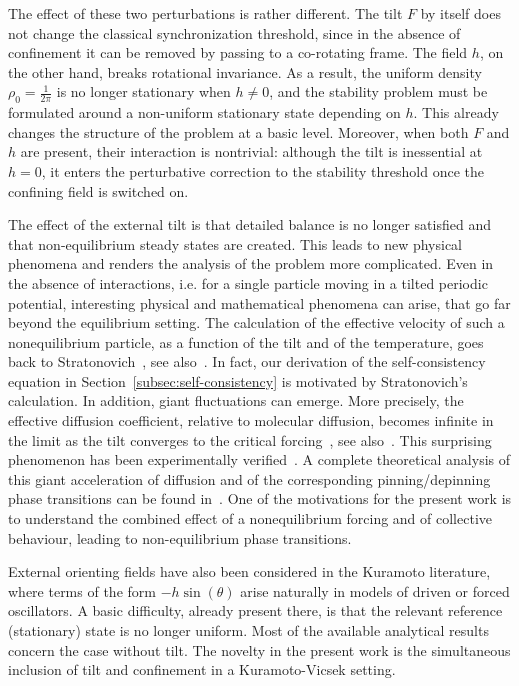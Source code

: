 \documentclass[a4paper,11pt]{article}
\theoremstyle{plain}
\theoremstyle{definition}
\theoremstyle{remark}
\begin{document}
The effect of these two perturbations is rather different. The tilt $F$ by itself does not change the classical synchronization threshold, since in the absence of confinement it can be removed by passing to a co-rotating frame. The field $h$, on the other hand, breaks rotational invariance. As a result, the uniform density $\rho_0 = \frac{1}{2\pi}$ is no longer stationary when $h\neq 0$, and the stability problem must be formulated around a non-uniform stationary state depending on $h$. This already changes the structure of the problem at a basic level. Moreover, when both $F$ and $h$ are present, their interaction is nontrivial: although the tilt is inessential at $h=0$, it enters the perturbative correction to the stability threshold once the confining field is switched on.

The effect of the external tilt is that detailed balance is no longer satisfied and that non-equilibrium steady states are created. This leads to new physical phenomena and renders the analysis of the problem more complicated. Even in the absence of interactions, i.e. for a single particle moving in a tilted periodic potential, interesting physical and mathematical phenomena can arise, that go far beyond the equilibrium setting. The calculation of the effective velocity of such a nonequilibrium particle, as a function of the tilt and of the temperature, goes back to Stratonovich~\cite{Straton63}, see also~\cite[Sec. 6.6]{pavliotis2014book}. In fact, our derivation of the self-consistency equation in Section~\ref{subsec:self-consistency} is motivated by Stratonovich's calculation. In addition, giant fluctuations can emerge. More precisely, the effective diffusion coefficient, relative to molecular diffusion, becomes infinite in the limit as the tilt converges to the critical forcing~\cite{reimann_al02}, see also~\cite[Sec. 6.6.]{pavliotis2014book}. This surprising phenomenon has been experimentally verified~\cite{Reimann_al2008}. A complete theoretical analysis of this giant acceleration of diffusion and of the corresponding pinning/depinning phase transitions can be found in~\cite{cheng2015long}. One of the motivations for the present work is to understand the combined effect of a nonequilibrium forcing and of collective behaviour, leading to non-equilibrium phase transitions. 

External orienting fields have also been considered in the Kuramoto literature, where terms of the form $-h\sin(\theta)$ arise naturally in models of driven or forced oscillators. A basic difficulty, already present there, is that the relevant reference (stationary) state is no longer uniform. Most of the available analytical results concern the case without tilt. The novelty in the present work is the simultaneous inclusion of tilt and confinement in a Kuramoto-Vicsek setting.
\end{document}
